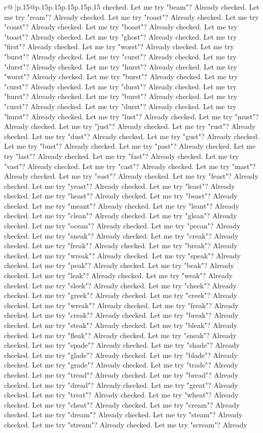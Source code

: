 \documentclass{article}
\begin{document}
{\begin{supertabular}{c@{$\;$}|p{.15\linewidth}@{}p{.15\linewidth}p{.15\linewidth}p{.15\linewidth}p{.15\linewidth}p{.15\linewidth}}
{{{checked. Let me try "beam"? Already checked. Let me try "ream"? Already checked. Let me try "roast"? Already checked. Let me try "coast"? Already checked. Let me try "boast"? Already checked. Let me try "toast"? Already checked. Let me try "ghost"? Already checked. Let me try "first"? Already checked. Let me try "worst"? Already checked. Let me try "burst"? Already checked. Let me try "curst"? Already checked. Let me try "durst"? Already checked. Let me try "hurst"? Already checked. Let me try "worst"? Already checked. Let me try "burst"? Already checked. Let me try "curst"? Already checked. Let me try "durst"? Already checked. Let me try "hurst"? Already checked. Let me try "burst"? Already checked. Let me try "curst"? Already checked. Let me try "durst"? Already checked. Let me try "hurst"? Already checked. Let me try "lust"? Already checked. Let me try "must"? Already checked. Let me try "just"? Already checked. Let me try "rust"? Already checked. Let me try "dust"? Already checked. Let me try "gust"? Already checked. Let me try "bust"? Already checked. Let me try "past"? Already checked. Let me try "last"? Already checked. Let me try "fast"? Already checked. Let me try "vast"? Already checked. Let me try "cast"? Already checked. Let me try "mast"? Already checked. Let me try "east"? Already checked. Let me try "feast"? Already checked. Let me try "yeast"? Already checked. Let me try "least"? Already checked. Let me try "heast"? Already checked. Let me try "beast"? Already checked. Let me try "meant"? Already checked. Let me try "leant"? Already checked. Let me try "clean"? Already checked. Let me try "glean"? Already checked. Let me try "ocean"? Already checked. Let me try "pecan"? Already checked. Let me try "sneak"? Already checked. Let me try "creak"? Already checked. Let me try "freak"? Already checked. Let me try "break"? Already checked. Let me try "wreak"? Already checked. Let me try "speak"? Already checked. Let me try "peak"? Already checked. Let me try "beak"? Already checked. Let me try "leak"? Already checked. Let me try "weak"? Already checked. Let me try "sleek"? Already checked. Let me try "cheek"? Already checked. Let me try "greek"? Already checked. Let me try "creek"? Already checked. Let me try "wreak"? Already checked. Let me try "freak"? Already checked. Let me try "creak"? Already checked. Let me try "break"? Already checked. Let me try "steak"? Already checked. Let me try "bleak"? Already checked. Let me try "fleak"? Already checked. Let me try "sneak"? Already checked. Let me try "spade"? Already checked. Let me try "shade"? Already checked. Let me try "glade"? Already checked. Let me try "blade"? Already checked. Let me try "grade"? Already checked. Let me try "trade"? Already checked. Let me try "tread"? Already checked. Let me try "bread"? Already checked. Let me try "dread"? Already checked. Let me try "great"? Already checked. Let me try "treat"? Already checked. Let me try "wheat"? Already checked. Let me try "cheat"? Already checked. Let me try "cream"? Already checked. Let me try "dream"? Already checked. Let me try "steam"? Already checked. Let me try "stream"? Already checked. Let me try "scream"? Already }}}
\end{supertabular}}
\end{document}
